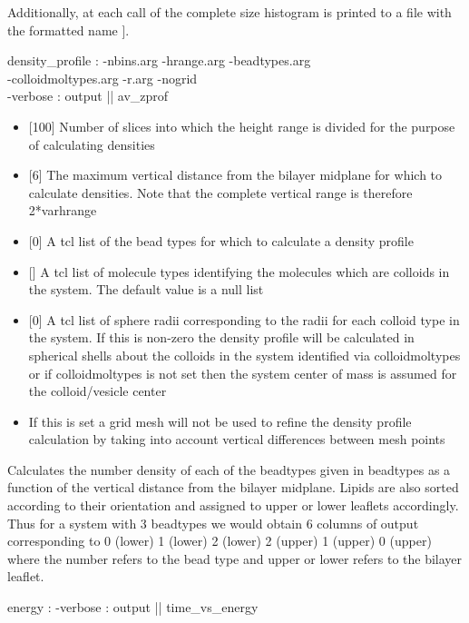Additionally, at each call of  the complete
size histogram is printed to a file with the formatted name
\codebox{sizehisto.[format \%05d \$time}].

\begin{code}
   density_profile  :  -nbins.arg -hrange.arg -beadtypes.arg \\
                     -colloidmoltypes.arg -r.arg -nogrid\\
                     -verbose  : output ||  av_zprof
\end{code}
\begin{itemize}
\item {} [100] Number of slices into which the height range
  is divided for the purpose of calculating densities
\item {} [6] The maximum vertical distance from the bilayer
  midplane for which to calculate densities. Note that the complete
  vertical range is therefore 2*var{hrange}
\item {} [0] A tcl list of the bead types for which to
  calculate a density profile
\item {} [] A tcl list of molecule types
  identifying the molecules which are colloids in the system. The
  default value is a null list
\item {} [0] A tcl list of sphere radii corresponding to the
  radii for each colloid type in the system. If this is non-zero the
  density profile will be calculated in spherical shells about the
  colloids in the system identified via colloidmoltypes or if
  colloidmoltypes is not set then the system center of mass is assumed
  for the colloid/vesicle center
\item {} If this is set a grid mesh will not be used to
  refine the density profile calculation by taking into account
  vertical differences between mesh points
\end{itemize}
Calculates the number density of each of the beadtypes given in
beadtypes as a function of the vertical distance from the bilayer
midplane. Lipids are also sorted according to their orientation and
assigned to upper or lower leaflets accordingly. Thus for a system
with 3 beadtypes we would obtain 6 columns of output corresponding to
0 (lower) 1 (lower) 2 (lower) 2 (upper) 1 (upper) 0 (upper) where the
number refers to the bead type and upper or lower refers to the
bilayer leaflet.
\begin{code}
  energy : -verbose : output || time_vs_energy
\end{code}
